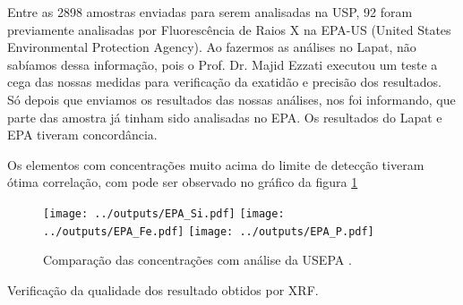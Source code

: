 Entre as 2898 amostras enviadas para serem analisadas na USP, 92 foram previamente 
analisadas por Fluorescência de Raios X na EPA-US
(United States Environmental Protection Agency). 
Ao fazermos as análises no Lapat, não sabíamos
dessa informação, pois o Prof. Dr. Majid Ezzati executou um teste a cega das 
nossas medidas para verificação da exatidão e precisão dos resultados. 
Só depois que enviamos os resultados das nossas análises, nos foi informando, 
que parte das amostra já tinham sido analisadas no EPA. Os resultados do Lapat
e EPA tiveram concordância. 

Os elementos com concentrações muito acima do limite de detecção tiveram ótima
correlação, com pode ser observado no gráfico da figura \ref{fig:epa} 

\begin{figure}[H]
  \centering
    \texttt{[image: ../outputs/EPA\_Si.pdf]}
    \texttt{[image: ../outputs/EPA\_Fe.pdf]}
    \texttt{[image: ../outputs/EPA\_P.pdf]}
  \caption{Comparação das concentrações com análise da USEPA \label{fig:epa}.}
\end{figure}

Verificação da qualidade dos resultado obtidos por XRF.
